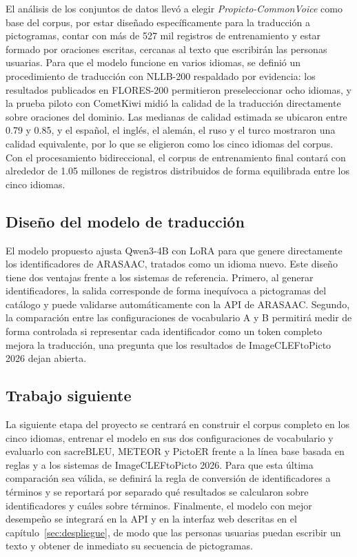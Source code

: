El análisis de los conjuntos de datos llevó a elegir \textit{Propicto-CommonVoice} como base del corpus, por estar diseñado específicamente para la traducción a pictogramas, contar con más de 527 mil registros de entrenamiento y estar formado por oraciones escritas, cercanas al texto que escribirán las personas usuarias. Para que el modelo funcione en varios idiomas, se definió un procedimiento de traducción con NLLB-200 respaldado por evidencia: los resultados publicados en FLORES-200 permitieron preseleccionar ocho idiomas, y la prueba piloto con CometKiwi midió la calidad de la traducción directamente sobre oraciones del dominio. Las medianas de calidad estimada se ubicaron entre 0.79 y 0.85, y el español, el inglés, el alemán, el ruso y el turco mostraron una calidad equivalente, por lo que se eligieron como los cinco idiomas del corpus. Con el procesamiento bidireccional, el corpus de entrenamiento final contará con alrededor de 1.05 millones de registros distribuidos de forma equilibrada entre los cinco idiomas.

\subsection{Diseño del modelo de traducción}

El modelo propuesto ajusta Qwen3-4B con LoRA para que genere directamente los identificadores de ARASAAC, tratados como un idioma nuevo. Este diseño tiene dos ventajas frente a los sistemas de referencia. Primero, al generar identificadores, la salida corresponde de forma inequívoca a pictogramas del catálogo y puede validarse automáticamente con la API de ARASAAC. Segundo, la comparación entre las configuraciones de vocabulario A y B permitirá medir de forma controlada si representar cada identificador como un token completo mejora la traducción, una pregunta que los resultados de ImageCLEFtoPicto 2026 dejan abierta.

\subsection{Trabajo siguiente}

La siguiente etapa del proyecto se centrará en construir el corpus completo en los cinco idiomas, entrenar el modelo en sus dos configuraciones de vocabulario y evaluarlo con sacreBLEU, METEOR y PictoER frente a la línea base basada en reglas y a los sistemas de ImageCLEFtoPicto 2026. Para que esta última comparación sea válida, se definirá la regla de conversión de identificadores a términos y se reportará por separado qué resultados se calcularon sobre identificadores y cuáles sobre términos. Finalmente, el modelo con mejor desempeño se integrará en la API y en la interfaz web descritas en el capítulo~\ref{sec:despliegue}, de modo que las personas usuarias puedan escribir un texto y obtener de inmediato su secuencia de pictogramas.

